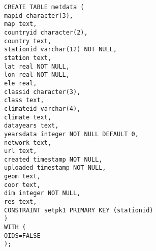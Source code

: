 \noindent \texttt{CREATE TABLE met\textunderscore data (\\
\indent mapid       character(3),\\
\indent map         text,\\
\indent countryid   character(2),\\
\indent country     text,\\
\indent stationid   varchar(12) NOT NULL,\\
\indent station     text,\\
\indent lat         real NOT NULL,\\
\indent lon         real NOT NULL,\\
\indent ele         real,\\
\indent classid     character(3),\\
\indent class       text,\\
\indent climateid   varchar(4),\\
\indent climate     text,\\
\indent data\textunderscore years    text,\\
\indent years\textunderscore data    integer NOT NULL DEFAULT 0,\\
\indent network     text,\\
\indent url         text,\\
\indent created     timestamp NOT NULL,\\
\indent uploaded    timestamp NOT NULL,\\
\indent geom        text,\\
\indent coor        text,\\
\indent dim         integer NOT NULL,\\
\indent res         text,\\
\indent CONSTRAINT set\textunderscore pk1 PRIMARY KEY (stationid)\\
)\\
WITH (\\
\indent OIDS=FALSE\\
);}\\

